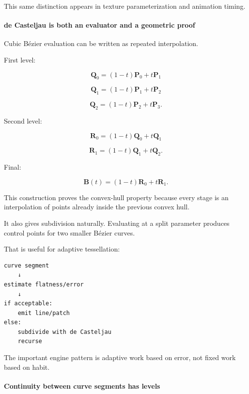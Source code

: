 This same distinction appears in texture parameterization and animation timing.

\paragraph{de Casteljau is both an evaluator and a geometric proof}\label{03-visual-computing-i-ch001-de-casteljau-is-both-an-evaluator-and-a-geometric-proof}

\hypertarget{03-visual-computing-i-ch001-de-casteljau-is-both-an-evaluator-and-a-geometric-proof}{}

Cubic Bézier evaluation can be written as repeated interpolation.

First level:

\[
\mathbf Q_0=(1-t)\mathbf P_0+t\mathbf P_1
\]

\[
\mathbf Q_1=(1-t)\mathbf P_1+t\mathbf P_2
\]

\[
\mathbf Q_2=(1-t)\mathbf P_2+t\mathbf P_3.
\]

Second level:

\[
\mathbf R_0=(1-t)\mathbf Q_0+t\mathbf Q_1
\]

\[
\mathbf R_1=(1-t)\mathbf Q_1+t\mathbf Q_2.
\]

Final:

\[
\mathbf B(t)=(1-t)\mathbf R_0+t\mathbf R_1.
\]

This construction proves the convex-hull property because every stage is an interpolation of points already inside the previous convex hull.

It also gives subdivision naturally. Evaluating at a split parameter produces control points for two smaller Bézier curves.

That is useful for adaptive tessellation:

\begin{verbatim}
curve segment
    ↓
estimate flatness/error
    ↓
if acceptable:
    emit line/patch
else:
    subdivide with de Casteljau
    recurse
\end{verbatim}

The important engine pattern is adaptive work based on error, not fixed work based on habit.

\paragraph{Continuity between curve segments has levels}\label{03-visual-computing-i-ch001-continuity-between-curve-segments-has-levels}

